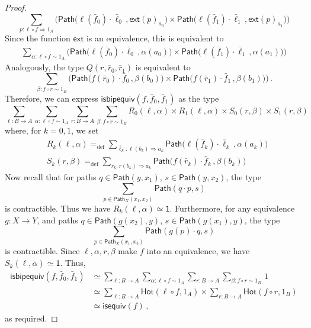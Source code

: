 \documentclass[10pt,a4paper,oneside,reqno]{amsart}
\numberwithin{equation}{section}
\theoremstyle{mythm}
\theoremstyle{mydef}
\theoremstyle{myrmk}
\newcommand{\defeq}{=_{\mathrm{def}}}
\newcommand{\co}{\colon}
\newcommand{\comp}{\circ}
\newcommand{\ct}{\cdot}
\newcommand{\isequiv}{\mathsf{isequiv}}
\newcommand{\ext}{\mathsf{ext}}
\newcommand{\Hot}{\mathsf{Hot}}
\newcommand{\Id}{\mathsf{Path}}
\newcommand{\one}{\mathsf{1}}
\newcommand{\isbipequiv}{\mathsf{isbipequiv}}
\begin{document}
\begin{proof}
\[
\sum_{ p : \ell \comp f \Rightarrow 1_A} \Big(
\Id  \big( \ell (\bar{f}_0) \ct \bar{\ell}_0 \, ,  \ext(p)_{a_0} \big) 
\times 
\Id \big( \ell(\bar{f}_1) \ct \bar{\ell}_1 \, ,  \ext(p)_{a_1} \big)
\Big)
\]
Since the function $\ext$ is an equivalence, this is equivalent to
\begin{align*}
\sum_{\alpha : \ell \comp f \sim 1_A} 
\Big( \Id  \big( \ell (\bar{f}_0) \ct \bar{\ell}_0 \, ,  \alpha(a_0) \big) 
\times 
\Id \big( \ell(\bar{f}_1) \ct \bar{\ell}_1 \, ,  \alpha(a_1) \big)
\Big)
\end{align*}
Analogously, the type $Q(r,\bar{r}_0,\bar{r}_1)$ is equivalent to
\[
\sum_{\beta : f \comp r \sim 1_B}
\Big(
\Id  \big( f (\bar{r}_0) \ct \bar{f}_0 \, ,  \beta(b_0) \big) 
\times 
\Id \big( f(\bar{r}_1) \ct \bar{f}_1 \, ,  \beta(b_1) \big)
\Big) \, .
\]
Therefore, we can express $\isbipequiv(f, \bar{f}_0, \bar{f}_1)$ as the type
\[
\sum_{\ell \co B \to  A} 
\sum_{\alpha : \ell \comp f \sim 1_A}
\sum_{ r \co B \to A} 
\sum_{\beta : f \comp r \sim 1_B} 
	R_0(\ell,\alpha) \times R_1(\ell,\alpha) \times S_0(r,\beta) \times S_1(r,\beta)
\]
where, for $k = 0,1$, we set
\begin{align*}
& R_k(\ell,\alpha) \defeq \sum_{\bar{\ell}_k : \ell(b_k) \Rightarrow a_k} \Id \big( \ell (\bar{f}_k) \ct \bar{\ell}_k \, ,  \alpha(a_k) \big) \\
& S_k(r,\beta) \defeq \sum_{\bar{r}_k : r(b_k) \Rightarrow a_k} \Id \big( f (\bar{r}_k) \ct \bar{f}_k \, ,  \beta(b_k) \big) 
\end{align*}
Now recall  that for paths $q \in \Id(y,x_1)$, $s \in \Id(y,x_2)$, the type 
\[
\sum_{p \in \Id_X(x_1,x_2)} \Id(q \ct p,s)
\] 
is contractible. Thus we have $R_k(\ell,\alpha) \simeq \one$.
Furthermore, for any equivalence $g : X \to Y$, and paths $q \in \Id(g(x_2),y)$, $s \in \Id(g(x_1),y)$, the type 
\[
\sum_{p \in \Id_X(x_1,x_2)} \Id(g(p) \ct q,s)
\] is contractible. Since $\ell, \alpha, r, \beta$ make $f$ into an equivalence, we have $S_k(\ell,\alpha) \simeq \one$. Thus,
\begin{align*} 
\isbipequiv(f,\bar{f}_0, \bar{f}_1) 
  & \simeq   \sum_{\ell \co B \to A} \sum_{\alpha : \ell \comp f \sim 1_A} \sum_{ r  \co B \to A} 
 \sum_{\beta \co f \comp r \sim 1_B} \, 1 \\
 & \simeq \sum_{\ell \co B \to A}  \Hot( \ell \comp f , 1_A ) \times 
\sum_{r  \co B \to A}  \Hot( f \comp r, 1_B ) \\
 & \simeq \isequiv(f) \, ,
\end{align*} 
as required.
\end{proof}
\end{document}
